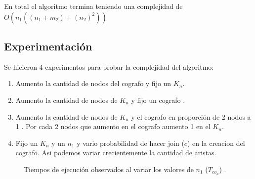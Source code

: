 En total el algoritmo termina teniendo una complejidad de $O(n_1((n_1 + m_2) + (n_2)^2 ))$

\subsection{Experimentación}

    Se hicieron 4 experimentos para probar la complejidad del algoritmo:

    \begin{enumerate}
    \item Aumento la cantidad de nodos del cografo y fijo un $K_n$. 
    \item Aumento la cantidad de nodos de $K_n$ y fijo un cografo .
    \item Aumento la cantidad de nodos de $K_n$ y el cografo en proporción de 2 nodos a 1 . Por cada 2 nodos que aumento en el cografo aumento 1 en el $K_n$.
    \item Fijo un $K_n$ y un $n_1$ y vario probabilidad de hacer join ($c$) en la creacion del cografo. Asi podemos variar crecientemente la cantidad de aristas.
    \end{enumerate}


    \begin{figure}[H]
        \centering
        \caption{Tiempos de ejecución observados al variar los valores de $n_1$
        ($T_{co_n}$) .}
        \label{fig:exp3:var-nym-base}
    \end{figure}


